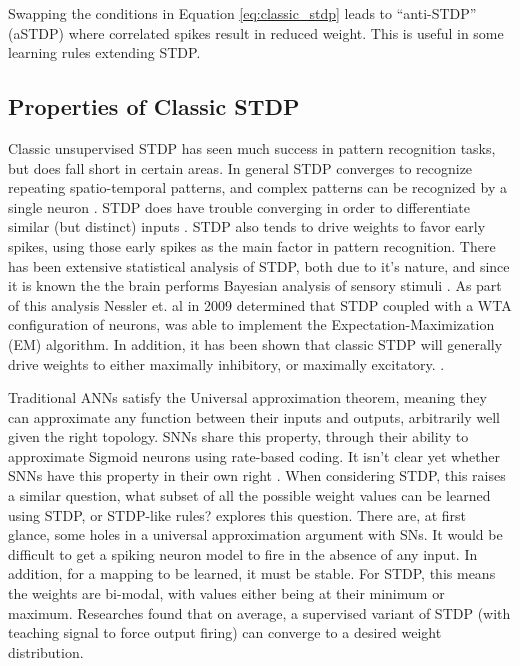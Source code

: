     Swapping the conditions in Equation \ref{eq:classic_stdp} leads to
    ``anti-STDP'' (aSTDP) where correlated spikes result in reduced weight. This
    is useful in some learning rules extending STDP.


    \subsection{Properties of Classic STDP}
    Classic unsupervised STDP has seen much success in pattern recognition
    tasks, but does fall short in certain areas. In general STDP converges to
    recognize repeating spatio-temporal patterns, and complex patterns can be
    recognized by a single neuron \cite{tavanaei_2019}. STDP does have trouble
    converging in order to differentiate similar (but distinct) inputs
    \cite{vigneron_2020}. STDP also tends to drive weights to favor early
    spikes, using those early spikes as the main factor in pattern
    recognition. There has been extensive statistical analysis of STDP, both due
    to it's nature, and since it is known the the brain performs Bayesian
    analysis of sensory stimuli \cite{tavanaei_2019}. As part of this analysis
    Nessler et. al in 2009 determined that STDP coupled with a WTA configuration
    of neurons, was able to implement the Expectation-Maximization (EM)
    algorithm. In addition, it has been shown that classic STDP will generally
    drive weights to either maximally inhibitory, or maximally
    excitatory. .


    Traditional ANNs satisfy the Universal approximation theorem, meaning they
    can approximate any function between their inputs and outputs, arbitrarily
    well given the right topology. SNNs share this property, through their
    ability to approximate Sigmoid neurons using rate-based coding. It isn't
    clear yet whether SNNs have this property in their own right
    \cite{legenstein_2005}. When considering STDP, this raises a similar
    question, what subset of all the possible weight values can be learned using
    STDP, or STDP-like rules? \cite{legenstein_2005} explores this
    question. There are, at first glance, some holes in a universal
    approximation argument with SNs. It would be difficult to get a spiking
    neuron model to fire in the absence of any input. In addition, for a mapping
    to be learned, it must be stable. For STDP, this means the weights are
    bi-modal, with values either being at their minimum or maximum. Researches
    found that on average, a supervised variant of STDP (with teaching signal to
    force output firing) can converge to a desired weight distribution.


